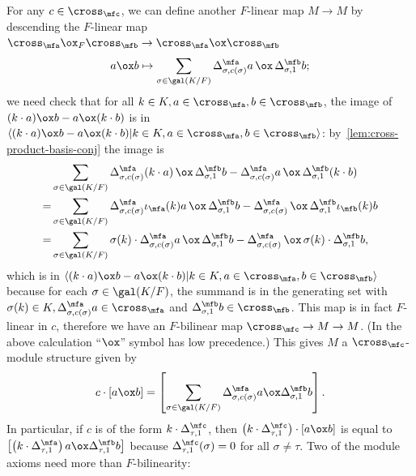\begin{construction}[$M$]
  For any $c \in \cross_{\mfc}$, we can define another $F$-linear map $M \to M$ by descending the $F$-linear map $\cross_{\mfa}\ox_{F}\cross_{\mfb} \to \cross_{\mfa}\ox \cross_{\mfb}$
  \[
      a \ox b \mapsto \sum_{\sigma\in\gal(K/F)} \Delta^{\mfa}_{\sigma,c(\sigma)}a \, \ox \, \Delta^{\mfb}_{\sigma, 1}b;
    \]
    we need check that for all $k \in K, a \in\cross_{\mfa}, b \in \cross_{\mfb}$, the image of $(k\cdot a)\ox b - a \ox (k\cdot b)$ is in
    $\left\langle (k\cdot a)\ox b - a \ox (k\cdot b) | k \in K, a \in \cross_{\mfa}, b \in \cross_{\mfb} \right\rangle$: by~\cref{lem:cross-product-basis-conj} the image is
    \[
\begin{aligned}
      & \sum_{\sigma\in\gal(K/F)}
      \Delta^{\mfa}_{\sigma, c(\sigma)}(k \cdot a) \,\ox\, \Delta^{\mfb}_{\sigma, 1}b
      -
        \Delta^{\mfa}_{\sigma, c(\sigma)}a \,\ox\, \Delta^{\mfb}_{\sigma, 1}(k \cdot b) \\
  = & \sum_{\sigma\in\gal(K/F)}
      \Delta^{\mfa}_{\sigma,c(\sigma)}\iota_{\mfa}(k)a \,\ox\, \Delta^{\mfb}_{\sigma,1}b
      -
      \Delta^{\mfa}_{\sigma,c(\sigma)} \,\ox\, \Delta^{\mfb}_{\sigma, 1}\iota_{\mfb}(k)b \\
  =& \sum_{\sigma\in\gal(K/F)}
     \sigma(k)\cdot\Delta^{\mfa}_{\sigma, c(\sigma)}a \,\ox\, \Delta^{\mfb}_{\sigma, 1}b
     - \Delta^{\mfa}_{\sigma, c(\sigma)} \,\ox\, \sigma(k)\cdot\Delta^{\mfb}_{\sigma,1}b,
  \end{aligned}
\]
which is in $\left\langle (k\cdot a)\ox b - a \ox (k\cdot b) | k \in K, a \in \cross_{\mfa}, b \in \cross_{\mfb} \right\rangle$ because for each $\sigma \in \gal(K/F)$, the summand is in the generating set with $\sigma(k) \in K, \Delta^{\mfa}_{\sigma, c(\sigma)}a \in \cross_{\mfa}$ and $\Delta^{\mfb}_{\sigma, 1}b \in \cross_{\mfb}$. This map is in fact $F$-linear in $c$, therefore we have an $F$-bilinear map $\cross_{\mfc}\to M \to M$. (In the above calculation ``$\ox$'' symbol has low precedence.) This gives $M$ a $\cross_{\mfc}$-module structure given by
\[
  c \cdot [a \ox b] = \left[\sum_{\sigma\in\gal(K/F)}\Delta^{\mfa}_{\sigma, c(\sigma)}a \ox \Delta^{\mfb}_{\sigma, 1}b\right].
\]
In particular, if $c$ is of the form $k \cdot \Delta^{\mfc}_{\tau, 1}$, then $\left(k\cdot \Delta^{\mfc}_{\tau, 1}\right)\cdot [a \ox b]$ is equal to $\left[\left(k\cdot \Delta^{\mfa}_{\tau,1}\right)a \ox \Delta^{\mfb}_{\tau, 1} b\right]$ because $\Delta_{\tau, 1}^{\mfc}(\sigma) = 0$ for all $\sigma \ne \tau$. Two of the module axioms need more than $F$-bilinearity:
\begin{itemize}

\end{itemize}
\end{construction}
